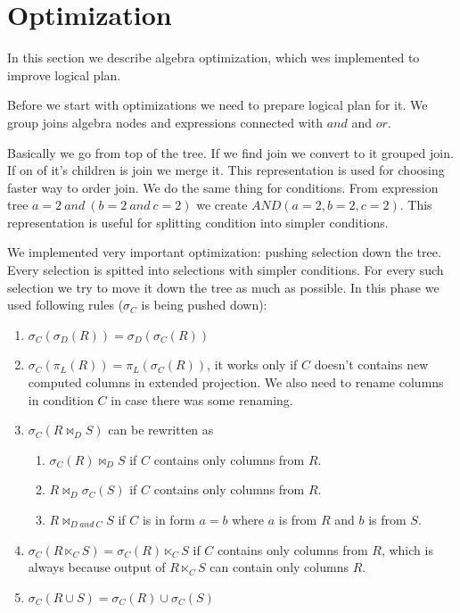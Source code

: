 \section{Optimization}

In this section we describe algebra optimization, which wes implemented to improve logical plan.

Before we start with optimizations we need to prepare logical plan for it. We group joins algebra nodes and expressions connected with $and$ and $or$.

Basically we go from top of the tree. If we find join we convert to it grouped join. If on of it's children is join we merge it. This representation is used for choosing faster way to order join. We do the same thing for conditions. From expression tree $a=2~and~(b=2~and~c=2)$ we create $AND(a=2,b=2,c=2)$. This representation is useful for splitting condition into simpler conditions.

We implemented very important optimization: pushing selection down the tree. Every selection is spitted into selections with simpler conditions. For every such selection we try to move it down the tree as much as possible. In this phase we used following rules ($\sigma_C$ is being pushed down):
\begin{enumerate}
\item $\sigma_C(\sigma_D(R))=\sigma_D(\sigma_C(R))$
\item $\sigma_C(\pi_L(R))=\pi_L(\sigma_C(R))$, it works only if $C$ doesn't contains new computed columns in extended projection. We also need to rename columns in condition $C$ in case there was some renaming.
\item  $\sigma_C(R \Join_D S)$ can be rewritten as
\begin{enumerate}
\item $\sigma_C(R) \Join_D S$ if $C$ contains only columns from $R$.
\item $R \Join_D \sigma_C(S)$ if $C$ contains only columns from $R$.
\item $R \Join_{D~and~C} S$ if $C$ is in form $a=b$ where $a$ is from $R$ and $b$ is from $S$.
\end{enumerate}
\item $\sigma_C(R \ltimes_C S)=\sigma_C(R)\ltimes_C S$ if $C$  contains only columns from $R$, which is always because output of $R \ltimes_C S$ can contain only columns $R$.
\item $\sigma_C(R\cup S)=\sigma_C(R)\cup \sigma_C(S)$
\end{enumerate}

